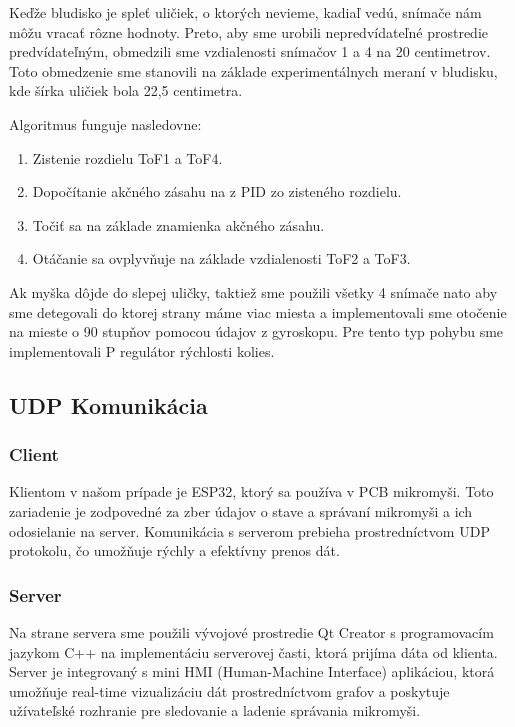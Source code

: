 Keďže bludisko je spleť uličiek, o ktorých nevieme, kadiaľ vedú, snímače nám môžu vracať rôzne hodnoty. Preto, aby sme urobili nepredvídateľné prostredie predvídateľným, obmedzili sme vzdialenosti snímačov 1 a 4 na 20 centimetrov. Toto obmedzenie sme stanovili na základe experimentálnych meraní v bludisku, kde šírka uličiek bola 22,5 centimetra.

Algoritmus funguje nasledovne:
\begin{enumerate}
	\item Zistenie rozdielu ToF1 a ToF4.
	\item Dopočítanie akčného zásahu na z PID zo zisteného rozdielu.
	\item Točiť sa na základe znamienka akčného zásahu.
	\item Otáčanie sa ovplyvňuje na základe vzdialenosti ToF2 a ToF3.
\end{enumerate}

Ak myška dôjde do slepej uličky, taktiež sme použili všetky 4 snímače nato aby sme detegovali do ktorej strany máme viac miesta a implementovali sme otočenie na mieste o 90 stupňov pomocou údajov z gyroskopu. Pre tento typ pohybu sme implementovali P regulátor rýchlosti kolies.
\subsection{UDP Komunikácia}

\subsubsection{Client}

Klientom v našom prípade je ESP32, ktorý sa používa v PCB mikromyši. Toto zariadenie je zodpovedné za zber údajov o stave a správaní mikromyši a ich odosielanie na server. Komunikácia s serverom prebieha prostredníctvom UDP protokolu, čo umožňuje rýchly a efektívny prenos dát.

\subsubsection{Server}

Na strane servera sme použili vývojové prostredie Qt Creator s programovacím jazykom C++ na implementáciu serverovej časti, ktorá prijíma dáta od klienta. Server je integrovaný s mini HMI (Human-Machine Interface) aplikáciou, ktorá umožňuje real-time vizualizáciu dát prostredníctvom grafov a poskytuje užívateľské rozhranie pre sledovanie a ladenie správania mikromyši.

